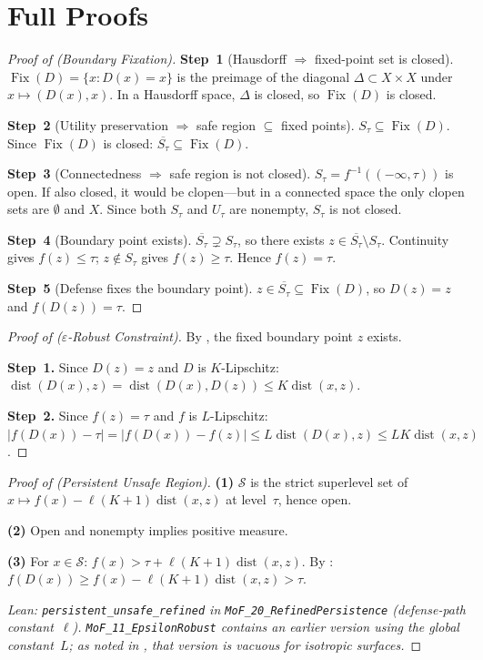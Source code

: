 \documentclass[11pt]{article}
\newcommand{\cl}[1]{\overline{#1}}
\newcommand{\Fix}{\operatorname{Fix}}
\newcommand{\dist}{\operatorname{dist}}
\begin{document}
\section{Full Proofs}
\label{app:proofs}

\begin{proof}[Proof of  (Boundary Fixation)]
\textbf{Step~1} (Hausdorff $\Rightarrow$ fixed-point set is closed).
$\Fix(D) = \{x : D(x) = x\}$ is the preimage of the diagonal
$\Delta \subset X \times X$ under $x \mapsto (D(x), x)$. In a
Hausdorff space, $\Delta$ is closed, so $\Fix(D)$ is closed.

\textbf{Step~2} (Utility preservation $\Rightarrow$ safe region
$\subseteq$ fixed points).
$S_\tau \subseteq \Fix(D)$. Since $\Fix(D)$ is closed:
$\cl{S_\tau} \subseteq \Fix(D)$.

\textbf{Step~3} (Connectedness $\Rightarrow$ safe region is not closed).
$S_\tau = f^{-1}((-\infty,\tau))$ is open. If also closed, it would be
clopen---but in a connected space the only clopen sets are $\emptyset$
and $X$. Since both $S_\tau$ and $U_\tau$ are nonempty, $S_\tau$ is not
closed.

\textbf{Step~4} (Boundary point exists).
$\cl{S_\tau} \supsetneq S_\tau$, so there exists
$z \in \cl{S_\tau} \setminus S_\tau$. Continuity gives
$f(z) \leq \tau$; $z \notin S_\tau$ gives $f(z) \geq \tau$. Hence
$f(z) = \tau$.

\textbf{Step~5} (Defense fixes the boundary point).
$z \in \cl{S_\tau} \subseteq \Fix(D)$, so $D(z) = z$ and
$f(D(z)) = \tau$.
\end{proof}

\begin{proof}[Proof of  ($\varepsilon$-Robust Constraint)]
By , the fixed boundary point $z$ exists.

\textbf{Step~1.} Since $D(z) = z$ and $D$ is $K$-Lipschitz:
$\dist(D(x), z) = \dist(D(x), D(z)) \leq K\dist(x, z)$.

\textbf{Step~2.} Since $f(z) = \tau$ and $f$ is $L$-Lipschitz:
$|f(D(x)) - \tau| = |f(D(x)) - f(z)| \leq L\dist(D(x), z) \leq
LK\dist(x, z)$.
\end{proof}

\begin{proof}[Proof of  (Persistent Unsafe Region)]
\textbf{(1)} $\mathcal{S}$ is the strict superlevel set of
$x \mapsto f(x) - \ell(K+1)\dist(x,z)$ at level~$\tau$, hence open.

\textbf{(2)} Open and nonempty implies positive measure.

\textbf{(3)} For $x \in \mathcal{S}$:
$f(x) > \tau + \ell(K+1)\dist(x,z)$. By :
$f(D(x)) \geq f(x) - \ell(K+1)\dist(x,z) > \tau$.

\noindent\emph{Lean:
\textup{\texttt{persistent\_unsafe\_refined}} in
\textup{\texttt{MoF\_20\_RefinedPersistence}}
(defense-path constant~$\ell$).
\textup{\texttt{MoF\_11\_EpsilonRobust}} contains an earlier version
using the global constant~$L$; as noted in
, that version is vacuous for isotropic surfaces.}
\end{proof}
\end{document}
